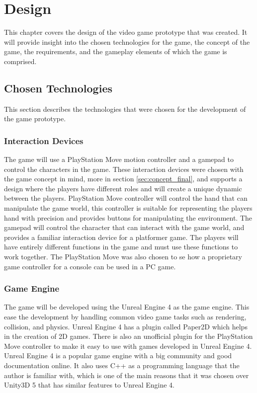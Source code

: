 \chapter{Design}
\label{chp:design}
This chapter covers the design of the video game prototype that was created. It will provide insight into the chosen technologies for the game, the concept of the game, the requirements, and the gameplay elements of which the game is comprised.

\section{Chosen Technologies}
\label{sec:chosen_tech}
This section describes the technologies that were chosen for the development of the game prototype.

\subsection{Interaction Devices}
The game will use a PlayStation Move motion controller and a gamepad to control the characters in the game. These interaction devices were chosen with the game concept in mind, more in section \ref{sec:concept_final}, and supports a design where the players have different roles and will create a unique dynamic between the players. PlayStation Move controller will control the hand that can manipulate the game world, this controller is suitable for representing the players hand with precision and provides buttons for manipulating the environment. The gamepad will control the character that can interact with the game world, and provides a familiar interaction device for a platformer game. The players will have entirely different functions in the game and must use these functions to work together. The PlayStation Move was also chosen to se how a proprietary game controller for a console can be used in a PC game.

\subsection{Game Engine}
The game will be developed using the Unreal Engine 4 as the game engine. This ease the development by handling common video game tasks such as rendering, collision, and physics. Unreal Engine 4 has a plugin called Paper2D which helps in the creation of 2D games. There is also an unofficial plugin for the PlayStation Move controller to make it easy to use with games developed in Unreal Engine 4. Unreal Engine 4 is a popular game engine with a big community and good documentation online. It also uses C++ as a programming language that the author is familiar with, which is one of the main reasons that it was chosen over Unity3D 5 that has similar features to Unreal Engine 4.

